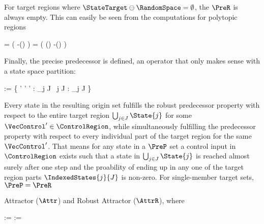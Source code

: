     For target regions where $\StateTarget \ominus \RandomSpace = \emptyset$, the $\PreR$ is always empty.
    This can easily be seen from the computations for polytopic regions

    \startformula
        \startalign[n=2,align={right,left}]
            \NC {} =
            \NC \StateRegion \cap \Big( \StateTarget \oplus -(\MatB \ControlRegion \oplus \RandomSpace) \Big) \MatA \EndAnd
            \NR
            \NC {} =
            \NC \StateRegion \cap \Big( (\StateTarget \ominus \RandomSpace) \oplus -(\MatB \ControlRegion \oplus \RandomSpace) \Big) \MatA \EndPeriod
            \NR
        \stopalign
    \stopformula

    Finally, the precise predecessor is defined, an operator that only makes sense with a state space partition:

    \startformula
        \startalign[n=2,align={right,left}]
            \NC {} := \Big\{ \VecState \in \StateSpace' \Bigmid \exists \VecControl' \in \ControlSpace' :
            \NC {} \subseteq \bigcup_{j \in J}  \;
            \NR
            \NC \empty
            \NC ~\forall j \in J :  \cap \bigcup_{j \in J}  \neq \emptyset \Big\} \EndPeriod
            \NR
        \stopalign
    \stopformula

    Every state in the resulting origin set fulfills the robust predecessor property with respect to the entire target region $\bigcup_{j \in J} \State{j}$ for some $\VecControl' \in \ControlRegion$, while simultaneously fulfilling the predecessor property with respect to every individual part of the target region for the same $\VecControl'$.
    That means for any state in a $\PreP$ set a control input in $\ControlRegion$ exists such that a state in $\bigcup_{j \in J} \State{j}$ is reached almost surely after one step and the proability of ending up in any one of the target region parts $\IndexedStates{j}{J}$ is non-zero.
    For single-member target sets, $\PreP = \PreR$

\stopsection


\startsubsection[title={Attractors}]

    Attractor ($\Attr$) and Robust Attractor ($\AttrR$), where

    \startformula
        \startalign[n=2,align={right,left}]
            \NC {} :=
            \NC {} \EndPeriod
            \NR
            \NC {} :=
            \NC {} \EndPeriod
            \NR
        \stopalign
    \stopformula

